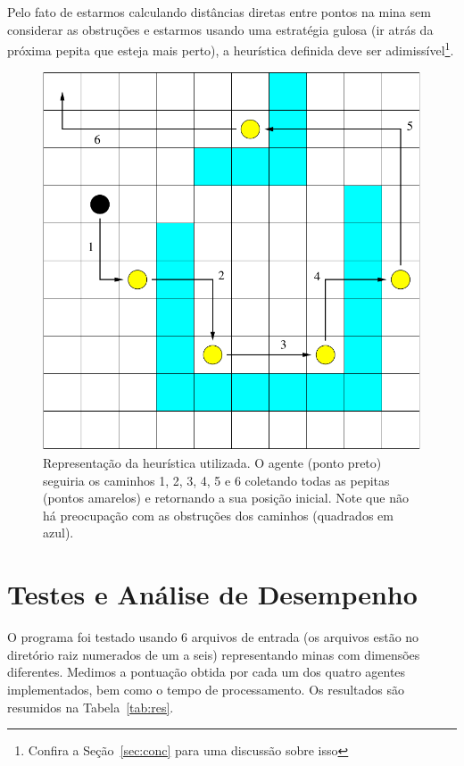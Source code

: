 \documentclass[12pt,a4paper]{article}
\begin{document}
Pelo fato de estarmos calculando distâncias diretas entre pontos na mina sem considerar as 
obstruções e estarmos usando uma estratégia gulosa (ir atrás da próxima pepita que esteja mais 
perto), a heurística definida deve ser adimissível\footnote{Confira a Seção~\ref{sec:conc} para uma
discussão sobre isso}.
%
\begin{figure}[htbp]
  \label{fig:mina}
  \begin{center}
    \includegraphics[scale=0.50]{mina.pdf}
    \caption{Representação da heurística utilizada. O agente (ponto preto) seguiria os caminhos 
    1, 2, 3, 4, 5 e 6 coletando todas as pepitas (pontos amarelos) e retornando a sua posição 
    inicial. Note que não há preocupação com as obstruções dos caminhos (quadrados em azul).}
  \end{center}
\end{figure}



\section{Testes e Análise de Desempenho}
\label{sec:teste}

O programa foi testado usando 6 arquivos de entrada (os arquivos estão no diretório raiz 
numerados de um a seis) representando minas com dimensões diferentes. Medimos a pontuação obtida 
por cada um dos quatro agentes implementados, bem como o tempo de processamento. Os resultados são 
resumidos na Tabela~\ref{tab:res}.
\end{document}
